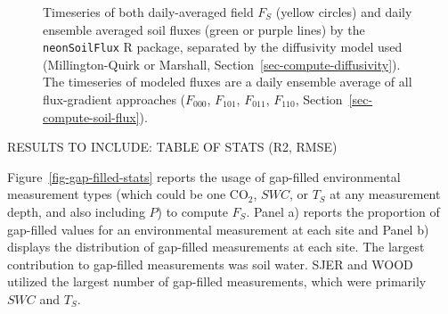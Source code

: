 \documentclass[
  letterpaper,
  DIV=11,
  numbers=noendperiod]{scrartcl}
\begin{document}
\begin{figure}


\caption{\label{fig-flux-results-year}Timeseries of both daily-averaged
field \(F_{S}\) (yellow circles) and daily ensemble averaged soil fluxes
(green or purple lines) by the \texttt{neonSoilFlux} R package,
separated by the diffusivity model used (Millington-Quirk or Marshall,
Section~\ref{sec-compute-diffusivity}). The timeseries of modeled fluxes
are a daily ensemble average of all flux-gradient approaches
(\(F_{000}\), \(F_{101}\), \(F_{011}\), \(F_{110}\),
Section~\ref{sec-compute-soil-flux}).}

\end{figure}%

RESULTS TO INCLUDE: TABLE OF STATS (R2, RMSE)

Figure~\ref{fig-gap-filled-stats} reports the usage of gap-filled
environmental measurement types (which could be one CO\(_{2}\), \(SWC\),
or \(T_{S}\) at any measurement depth, and also including \(P\)) to
compute \(F_{S}\). Panel a) reports the proportion of gap-filled values
for an environmental measurement at each site and Panel b) displays the
distribution of gap-filled measurements at each site. The largest
contribution to gap-filled measurements was soil water. SJER and WOOD
utilized the largest number of gap-filled measurements, which were
primarily \(SWC\) and \(T_{S}\).
\end{document}

